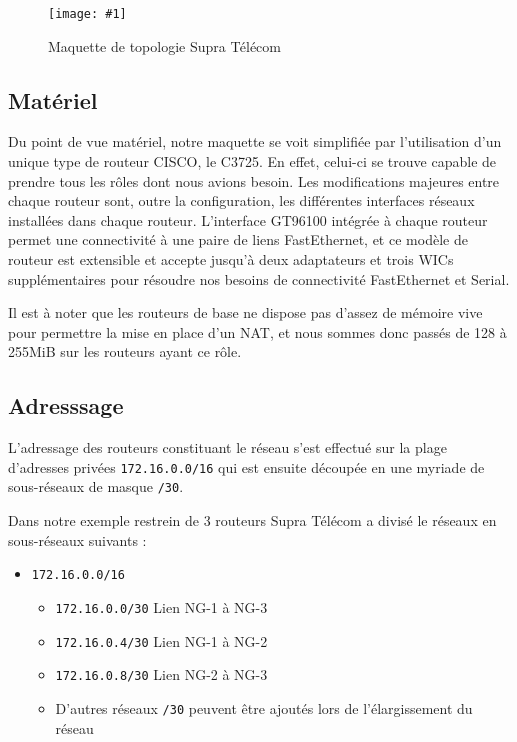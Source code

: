 \documentclass{article}
\newenvironment{figue}[1]{
	\par
	\bigskip
	\begin{figure}[h]
	\begin{center}
	  \texttt{[image: \#1]}
	\end{center}
}{
	\end{figure}
	\bigskip
}
\newcommand{\spr}{Supra Télécom\xspace}
\begin{document}
\begin{figue}{img/nuage-supra.pdf}
	\caption{Maquette de topologie \spr}
\end{figue}

\subsection{Matériel}

Du point de vue matériel, notre maquette se voit simplifiée par l'utilisation d'un unique type de routeur CISCO, le C3725.
En effet, celui-ci se trouve capable de prendre tous les rôles dont nous avions besoin.
Les modifications majeures entre chaque routeur sont, outre la configuration, les différentes interfaces réseaux installées dans chaque routeur.
L'interface GT96100 intégrée à chaque routeur permet une connectivité à une paire de liens FastEthernet, et ce modèle de routeur est extensible et accepte jusqu'à deux adaptateurs et trois WICs supplémentaires pour résoudre nos besoins de connectivité FastEthernet et Serial.

Il est à noter que les routeurs de base ne dispose pas d'assez de mémoire vive pour permettre la mise en place d'un NAT, et nous sommes donc passés de 128 à 255MiB sur les routeurs ayant ce rôle.

\subsection{Adresssage}
\label{adressage}

L'adressage des routeurs constituant le réseau s'est effectué sur la plage d'adresses privées \texttt{172.16.0.0/16} qui est ensuite découpée en une myriade de sous-réseaux de masque \texttt{/30}.

Dans notre exemple restrein de 3 routeurs \spr a divisé le réseaux en sous-réseaux suivants :

\bigskip

\begin{itemize}
	\item \texttt{172.16.0.0/16}
	\begin{itemize}
		\item \texttt{172.16.0.0/30} Lien NG-1 à NG-3
		\item \texttt{172.16.0.4/30} Lien NG-1 à NG-2
		\item \texttt{172.16.0.8/30} Lien NG-2 à NG-3
		\item D'autres réseaux \texttt{/30} peuvent être ajoutés lors de l'élargissement du réseau
	\end{itemize}
\end{itemize}
\end{document}
